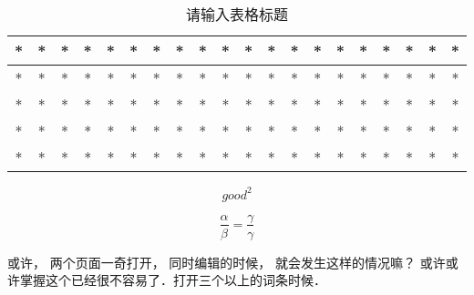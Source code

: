 
\begin{table}[ht]
\centering
\caption{请输入表格标题}\label{test_tab1}
\begin{tabular}{|c|c|c|c|c|c|c|c|c|c|c|c|c|c|c|c|c|c|c|c|}
\hline
* & * & * & * & * & * & * & * & * & * & * & * & * & * & * & * & * & * & * & * \\
\hline
* & * & * & * & * & * & * & * & * & * & * & * & * & * & * & * & * & * & * & * \\
\hline
* & * & * & * & * & * & * & * & * & * & * & * & * & * & * & * & * & * & * & * \\
\hline
* & * & * & * & * & * & * & * & * & * & * & * & * & * & * & * & * & * & * & * \\
\hline
* & * & * & * & * & * & * & * & * & * & * & * & * & * & * & * & * & * & * & * \\
\hline
\end{tabular}
\end{table}

\begin{equation}
good^2
\end{equation}

\begin{equation}
\frac{\alpha}{\beta} = \frac{\gamma}{\gamma}
\end{equation}

或许， 两个页面一奇打开， 同时编辑的时候， 就会发生这样的情况嘛？
或许或许掌握这个已经很不容易了．打开三个以上的词条时候．
